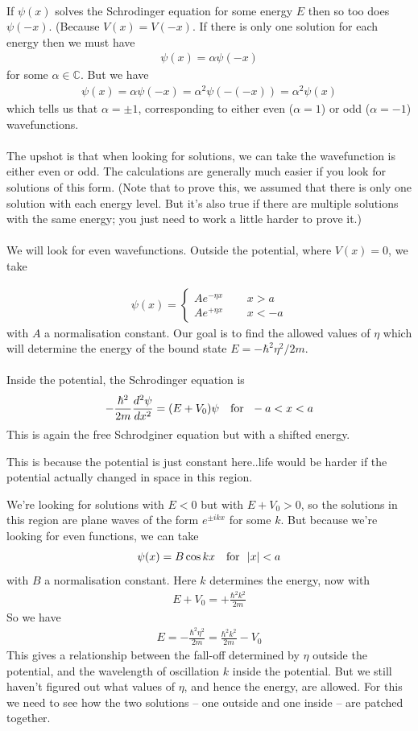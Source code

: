 \documentclass[12pt]{article}
\def\be{\begin{eqnarray}}
\def\ee{\end{eqnarray}}
\newcommand{\nn}{\nonumber}
\newcommand\para{\paragraph{}}
\newcommand{\co}{\color{olive}}
\newcommand{\C}{{\mathds C}}
\begin{document}
\para
{\co If $\psi(x)$ solves the Schrodinger equation for some energy $E$ then so too does $\psi(-x)$. (Because $V(x) = V(-x)$. If there is only one solution for each energy then we must have
%
\be \psi(x) = \alpha \psi(-x)\nn\ee
%
for some $\alpha\in \C$. But we have
%
\be \psi(x)= \alpha\psi(-x)  = \alpha^2\psi(-(-x)) =  \alpha^2\psi(x)\nn\ee
%
which tells us that $\alpha =\pm 1$, corresponding to either even ($\alpha=1$) or odd ($\alpha=-1$) wavefunctions.} 

\para
The upshot is that when looking for solutions, we can take the wavefunction is either even or odd. The calculations are generally much easier if you look for solutions of this form. (Note that to prove this, we assumed that there is only one solution with each energy level. But it's also true if there are multiple solutions with the same energy; you just need to work a little harder to prove it.)

\para
{\co We will look for even wavefunctions. Outside the potential, where $V(x) =0$, we take

%
\be \psi(x) = \left\{\begin{array}{cc} A e^{-\eta x}\ \ \ &\ \ \ {x>a}\\Ae^{+\eta x}\ \ \ & \ \ \ x<-a\end{array}\right.\nn\ee
%
with $A$  a normalisation constant. Our goal is to find the allowed values of $\eta$ which will determine the energy of the bound state $E=-\hbar^2\eta^2/2m$.

\para
Inside the potential, the Schrodinger equation is
%
\be -\frac{\hbar^2}{2m}\frac{d^2\psi}{dx^2}  = (E+V_0)\psi\ \ \ {\rm for} \ \ -a<x<a\nn\ee
%
This is again the free Schrodginer equation but with a shifted energy. } This is because the potential is just constant here..life would be harder if the potential actually changed in space in this region. 

{\co We're looking for solutions with $E<0$ but with $E+V_0>0$, so the solutions in this region are plane waves of the form $e^{\pm i kx}$ for some $k$. But because we're looking for even functions, we can take
%
\be \psi(x) = B\cos kx\ \ \ {\rm for} \ \   |x|< a\nn\ee
%
with $B$  a normalisation constant. Here $k$ determines the energy, now with
%
\be E+V_0 = +\frac{\hbar^2 k^2}{2m}\nn\ee
%
So we have
%
\be E = -\frac{\hbar^2\eta^2}{2m} = \frac{\hbar^2 k^2}{2m} - V_0\nn\ee
%
} This gives a relationship between the fall-off determined  by $\eta$ outside the potential, and the wavelength of oscillation $k$ inside the potential. But we still haven't figured out what values of $\eta$, and hence the energy, are allowed.  For this we need to see how the two solutions -- one outside and one inside -- are patched together.
\end{document}
